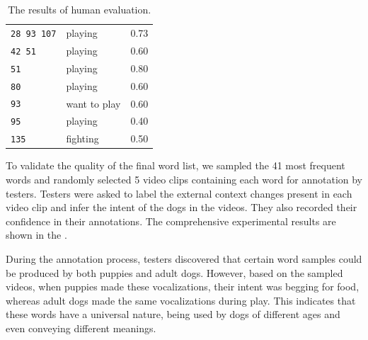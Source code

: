\begin{table}[th]
\begin{tabular}{lll}
		\verb|28 93 107| & playing & 0.73\\
		\verb|42 51| & playing & 0.60\\
		\verb|51| & playing & 0.80\\
		\verb|80| & playing & 0.60\\
		\verb|93| & want to play & 0.60\\
		\verb|95| & playing & 0.40\\
		\verb|135| & fighting & 0.50\\\hline
	\end{tabular}
	\caption{The results of human evaluation.}
	\label{tab:rohe}
\end{table}


To validate the quality of the final word list, we sampled the 41 most frequent words and randomly selected 5 video clips containing each word for annotation by testers. Testers were asked to label the external context changes present in each video clip and infer the intent of the dogs in the videos. They also recorded their confidence in their annotations. The comprehensive experimental results are shown in the .



During the annotation process, testers discovered that certain word samples could be produced by both puppies and adult dogs. However, based on the sampled videos, when puppies made these vocalizations, their intent was begging for food, whereas adult dogs made the same vocalizations during play. This indicates that these words have a universal nature, being used by dogs of different ages and even conveying different meanings.

